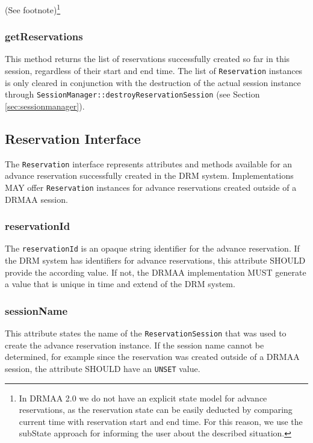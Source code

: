 \documentclass{article}
\newcommand{\h}[1]{\lstinline|#1|}
\newcommand{\rat}[1]{ {\tiny(See footnote)}\footnote{#1} }
\begin{document}
\rat{In DRMAA 2.0 we do not have an explicit state model for advance reservations, as the reservation state can be easily deducted by comparing current time with reservation start and end time. For this reason, we use the subState approach for informing the user about the described situation. }

\subsubsection{getReservations}

This method returns the list of reservations successfully created so far in this session, regardless of their start and end time. The list of \h{Reservation} instances is only cleared in conjunction with the destruction of the actual session instance through \h{SessionManager::destroyReservationSession} (see Section \ref{sec:sessionmanager}).

\subsection{Reservation Interface}
\label{sec:reservation}

The \h{Reservation} interface represents attributes and methods available for an advance reservation successfully created in the DRM system.  Implementations MAY offer \h{Reservation} instances for advance reservations created outside of a DRMAA session.




\subsubsection{reservationId}
\label{sec:reservationid}

The \h{reservationId} is an opaque string identifier for the advance reservation. If the DRM system has identifiers for advance reservations, this attribute SHOULD provide the according value. If not, the DRMAA implementation MUST generate a value that is unique in time and extend of the DRM system.

\subsubsection{sessionName}

This attribute states the name of the \h{ReservationSession} that was used to create the advance reservation instance. If the session name cannot be determined, for example since the reservation was created outside of a DRMAA session, the attribute SHOULD have an \h{UNSET} value.
\end{document}
